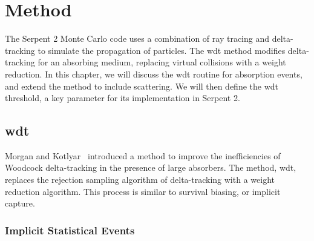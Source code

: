 \chapter{Method}
\label{chap:method}

The Serpent 2 Monte Carlo code uses a combination of  ray tracing and
delta-tracking to simulate the propagation of particles. The \gls{wdt}
method modifies delta-tracking for an absorbing medium, replacing virtual
collisions with a weight reduction. In this chapter, we will discuss
the \gls{wdt} routine for absorption events, and extend the method to
include scattering. We will then define the \gls{wdt} threshold, a key
parameter for its implementation in Serpent 2.

\section{\Acrlong{wdt}}
\label{sec:wdt}

Morgan and Kotlyar~\cite{morgan2015} introduced a method to improve the
inefficiencies of Woodcock delta-tracking in the presence of large
absorbers. The method, \gls{wdt}, replaces the
rejection sampling algorithm of delta-tracking with a weight reduction
algorithm. This process is similar to survival biasing, or implicit capture.

\subsection{Implicit Statistical Events}
\label{sec:implicit}

